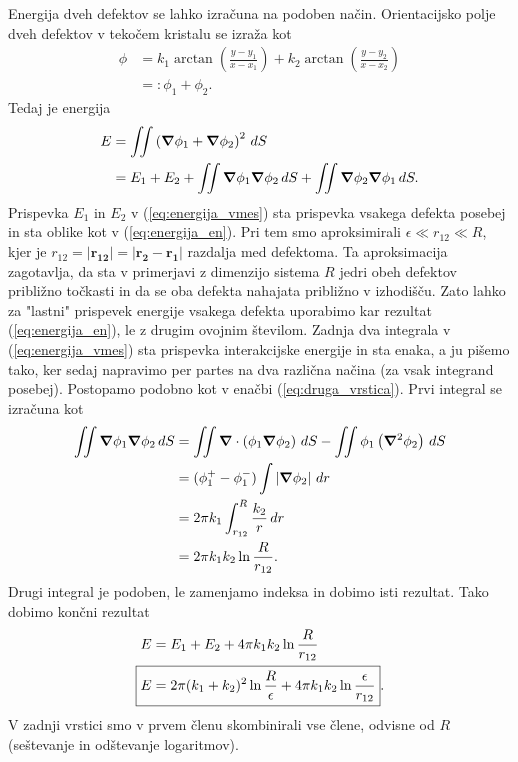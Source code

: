\documentclass[11pt]{article}
\begin{document}
Energija dveh defektov se lahko izračuna na podoben način. Orientacijsko polje dveh defektov v tekočem kristalu se izraža kot 
\begin{align}
    \phi&=k_1 \arctan\left(\frac{y-y_{1}}{x-x_{1}}\right) + k_2 \arctan\left(\frac{y-y_{2}}{x-x_{2}}\right) \nonumber \\
    &=: \phi_{1} + \phi_{2}. \nonumber
\end{align}
Tedaj je energija
\begin{align}
    E &= \iint \left(\grad\phi_{1} + \grad\phi_{2}\right)^{2}\,dS \nonumber \\
    &=E_1 + E_2 + \iint \grad\phi_{1} \grad\phi_{2} \, dS +  \iint \grad\phi_{2} \grad\phi_{1} \,dS. \label{eq:energija_vmes}
\end{align}
Prispevka $E_{1}$ in $E_{2}$ v (\ref{eq:energija_vmes}) sta prispevka vsakega defekta posebej in sta oblike kot v (\ref{eq:energija_en}). Pri tem smo aproksimirali $\epsilon \ll r_{12} \ll R$, kjer je $r_{12} = \left|\bm{r_{12}}\right| = \left|\bm{r_{2}}-\bm{r_{1}}\right|$ razdalja med defektoma. Ta aproksimacija zagotavlja, da sta v primerjavi z dimenzijo sistema $R$ jedri obeh defektov približno točkasti in da se oba defekta nahajata približno v izhodišču. Zato lahko za "lastni" prispevek energije vsakega defekta uporabimo kar rezultat (\ref{eq:energija_en}), le z drugim ovojnim številom. Zadnja dva integrala v (\ref{eq:energija_vmes}) sta prispevka interakcijske energije in sta enaka, a ju pišemo tako, ker sedaj napravimo per partes na dva različna načina (za vsak integrand posebej). Postopamo podobno kot v enačbi (\ref{eq:druga_vrstica}). Prvi integral se izračuna kot
\begin{align}
    \iint \grad\phi_{1} \grad\phi_{2} \, dS &= \iint \grad \cdot \left(\phi_{1}\grad\phi_{2}\right) \,dS - \iint \phi_{1}\left(\grad^{2}\phi_{2}\right) \,dS \nonumber \\
    &=(\phi_{1}^{+} - \phi_{1}^{-}) \int \left|\grad\phi_{2}\right| \, dr \nonumber \\
    &=2\pi k_{1} \int_{r_{12}}^{R} \frac{k_{2}}{r} \, dr \nonumber \\
    &=2\pi k_{1} k_{2} \ln{\frac{R}{r_{12}}}. \nonumber
\end{align}
Drugi integral je podoben, le zamenjamo indeksa in dobimo isti rezultat.
Tako dobimo končni rezultat
\begin{align}
    E&=E_1 + E_2 + 4\pi k_{1} k_{2} \ln{\frac{R}{r_{12}}} \nonumber \\
    \Aboxed{E&=2\pi (k_{1} + k_{2})^{2} \ln{\frac{R}{\epsilon}} + 4\pi k_{1}k_{2}\ln{\frac{\epsilon}{r_{12}}}}.
\end{align}
V zadnji vrstici smo v prvem členu skombinirali vse člene, odvisne od $R$ (seštevanje in odštevanje logaritmov).
\end{document}
